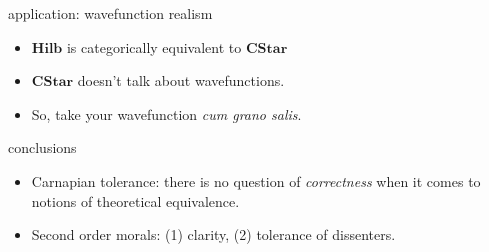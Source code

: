 \documentclass[17pt]{beamer}
\begin{document}
\begin{frame}{\small application: wavefunction realism}

\begin{itemize}
\item $\mathbf{Hilb}$ is categorically equivalent to $\mathbf{CStar}$
\item $\mathbf{CStar}$ doesn't talk about wavefunctions.
\item So, take your wavefunction \emph{cum grano salis}. \end{itemize}

\end{frame}


\begin{frame}{\small conclusions}

\begin{itemize}
\item Carnapian tolerance: there is no question of \emph{correctness}
  when it comes to notions of theoretical equivalence.
\item Second order morals: (1) clarity, \newline (2) tolerance of
  dissenters.
\end{itemize}

\end{frame}
\end{document}
